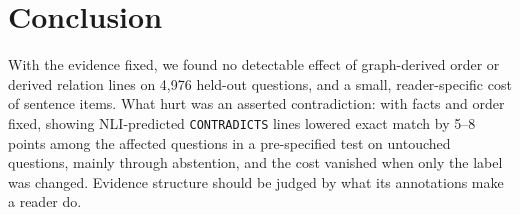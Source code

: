 \section{Conclusion}
\label{sec:conclusion}

With the evidence fixed, we found no detectable effect of graph-derived order or derived relation lines on 4{,}976 held-out questions, and a small, reader-specific cost of sentence items. What hurt was an asserted contradiction: with facts and order fixed, showing NLI-predicted \texttt{CONTRADICTS} lines lowered exact match by 5--8 points among the affected questions in a pre-specified test on untouched questions, mainly through abstention, and the cost vanished when only the label was changed. Evidence structure should be judged by what its annotations make a reader do.
